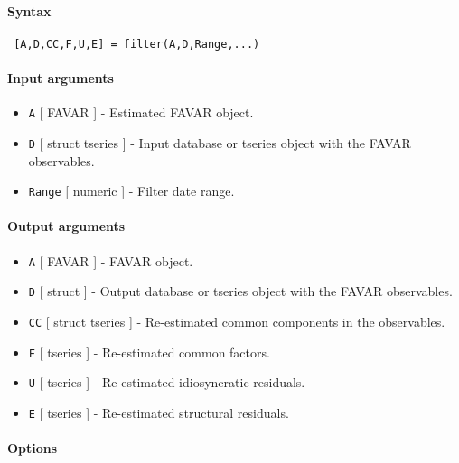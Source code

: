 


	\paragraph{Syntax}
 
 \begin{verbatim}
 [A,D,CC,F,U,E] = filter(A,D,Range,...)
 \end{verbatim}
 
 \paragraph{Input arguments}
 
 \begin{itemize}
 \item
   \texttt{A} {[} FAVAR {]} - Estimated FAVAR object.
 \item
   \texttt{D} {[} struct \textbar{} tseries {]} - Input database or
   tseries object with the FAVAR observables.
 \item
   \texttt{Range} {[} numeric {]} - Filter date range.
 \end{itemize}
 
 \paragraph{Output arguments}
 
 \begin{itemize}
 \item
   \texttt{A} {[} FAVAR {]} - FAVAR object.
 \item
   \texttt{D} {[} struct {]} - Output database or tseries object with the
   FAVAR observables.
 \item
   \texttt{CC} {[} struct \textbar{} tseries {]} - Re-estimated common
   components in the observables.
 \item
   \texttt{F} {[} tseries {]} - Re-estimated common factors.
 \item
   \texttt{U} {[} tseries {]} - Re-estimated idiosyncratic residuals.
 \item
   \texttt{E} {[} tseries {]} - Re-estimated structural residuals.
 \end{itemize}
 
 \paragraph{Options}
 
